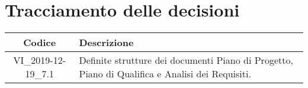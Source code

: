 \section*{Tracciamento delle decisioni}

\begin{center}
	\begin{longtable}{|c|p{12.25cm}|}
	\hline
	\rowcolor{lighter-grayer}
	\textbf{Codice} & \textbf{Descrizione} \\
	\hline
	\endfirsthead
	
	\hline
	VI\_2019-12-19\_7.1 & Definite strutture dei documenti Piano di Progetto, Piano di Qualifica e Analisi dei Requisiti. \\
	\hline

	\end{longtable}
\end{center}